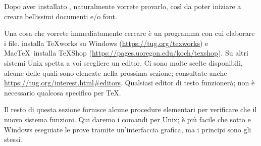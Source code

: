 \documentclass{article}
\begin{document}
Dopo aver installato \TL, naturalmente vorrete provarlo, così da poter
iniziare a creare bellissimi documenti e\slash o font.

Una cosa che vorrete immediatamente cercare è un programma con cui
elaborare i file. \TL{} installa \TeX{}works su Windows
(\url{https://tug.org/texworks}) e Mac\TeX\ installa TeXShop
(\url{https://pages.uoregon.edu/koch/texshop}). Su altri sistemi Unix
spetta a voi scegliere un editor. Ci sono molte scelte disponibili, alcune
delle quali sono elencate nella prossima sezione; consultate anche
\url{https://tug.org/interest.html#editors}. Qualsiasi editor di testo
funzionerà; non è necessario qualcosa specifico per \TeX.

Il resto di questa sezione fornisce alcune procedure elementari per verificare che il
nuovo sistema funzioni. Qui daremo i comandi per Unix; è più facile che
sotto \MacOSX e Windows eseguiate le prove tramite un'interfaccia grafica,
ma i principi sono gli stessi.
\end{document}

